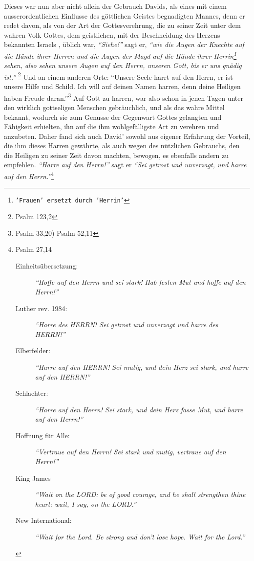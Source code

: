 \medskip

Dieses war nun aber nicht allein der Gebrauch Davids, als eines mit einem
ausserordentlichen Einflusse des göttlichen Geistes begnadigten Mannes, denn er
redet davon, als von der Art der Gottesverehrung, die zu seiner Zeit unter dem
wahren Volk Gottes, dem geistlichen, mit der
Beschneidung des Herzens  bekannten
Israels , üblich war, \textit{"`Siehe!"'} sagt er,
\textit{"`wie die Augen der Knechte auf die
Hände ihrer Herren und die Augen der Magd auf die Hände ihrer
Herrin\footnote{\texttt{'Frauen' ersetzt durch 'Herrin'}} sehen,
also sehen unsere Augen auf den Herrn, unseren Gott, bis er uns gnädig
ist."'} 
\footnote{Psalm 123,2}
Und an einem anderen Orte:
"`Unsere Seele harrt auf den Herrn, er ist unsere Hilfe und Schild. Ich will
auf deinen Namen harren,
denn deine Heiligen haben Freude daran."'\footnote{Psalm 33,20)  Psalm 52,11}
Auf Gott zu harren, war also schon in jenen Tagen unter den wirklich gottseligen
Menschen gebräuchlich, und als das wahre Mittel bekannt, wodurch sie zum Genusse
der Gegenwart Gottes  gelangten und Fähigkeit
erhielten, ihn auf die ihm
wohlgefälligste Art zu verehren und anzubeten. Daher fand sich auch David'
sowohl aus eigener Erfahrung der Vorteil, die ihm
dieses Harren gewährte, als
auch wegen des nützlichen Gebrauchs, den die Heiligen zu seiner Zeit davon
machten, bewogen, es ebenfalls andern zu empfehlen.
\textit{"`Harre auf den Herrn!"'}  sagt
er
\textit{"`Sei getrost und unverzagt, und harre auf den Herrn."'}\footnote{Psalm
27,14
\begin{description}
 \item[Einheitsübersetzung:] \textit{"`Hoffe auf den Herrn und sei stark! Hab
festen Mut und hoffe auf den Herrn!"'}
 \item[Luther rev. 1984:] \textit{"`Harre des HERRN! Sei getrost und unverzagt
und harre des HERRN!"'}
 \item[Elberfelder:] \textit{"`Harre auf den HERRN! Sei mutig, und dein Herz sei
stark, und harre auf den HERRN!"'}
 \item[Schlachter:] \textit{"`Harre auf den Herrn! Sei stark, und dein Herz
fasse Mut, und harre auf den Herrn!"'}
 \item[Hoffnung für Alle:] \textit{"`Vertraue auf den Herrn! Sei stark und
mutig, vertraue auf den Herrn!"'}
 \item[King James]
\textit{ "`Wait on the LORD: be of good courage, and he shall strengthen thine
heart: wait, I say, on the LORD."'}
 \item[New International:] \textit{ "`Wait for the Lord. Be strong and don't
lose hope. Wait for the Lord."'}
 \end{description}
}
